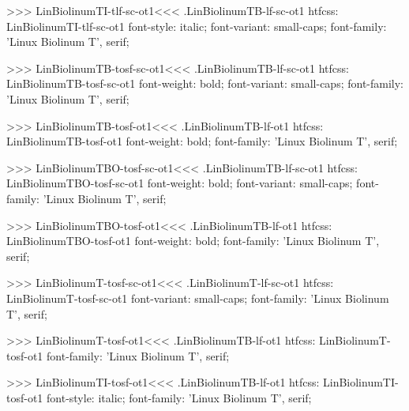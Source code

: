 {{{>>>
\<LinBiolinumTI-tlf-sc-ot1\><<<
.LinBiolinumTB-lf-sc-ot1
htfcss:  LinBiolinumTI-tlf-sc-ot1  font-style: italic; font-variant: small-caps; font-family: 'Linux Biolinum T', serif;

>>>
\<LinBiolinumTB-tosf-sc-ot1\><<<
.LinBiolinumTB-lf-sc-ot1
htfcss:  LinBiolinumTB-tosf-sc-ot1  font-weight: bold; font-variant: small-caps; font-family: 'Linux Biolinum T', serif;

>>>
\<LinBiolinumTB-tosf-ot1\><<<
.LinBiolinumTB-lf-ot1
htfcss:  LinBiolinumTB-tosf-ot1  font-weight: bold; font-family: 'Linux Biolinum T', serif;

>>>
\<LinBiolinumTBO-tosf-sc-ot1\><<<
.LinBiolinumTB-lf-sc-ot1
htfcss:  LinBiolinumTBO-tosf-sc-ot1  font-weight: bold; font-variant: small-caps; font-family: 'Linux Biolinum T', serif;

>>>
\<LinBiolinumTBO-tosf-ot1\><<<
.LinBiolinumTB-lf-ot1
htfcss:  LinBiolinumTBO-tosf-ot1  font-weight: bold; font-family: 'Linux Biolinum T', serif;

>>>
\<LinBiolinumT-tosf-sc-ot1\><<<
.LinBiolinumT-lf-sc-ot1
htfcss:  LinBiolinumT-tosf-sc-ot1  font-variant: small-caps; font-family: 'Linux Biolinum T', serif;

>>>
\<LinBiolinumT-tosf-ot1\><<<
.LinBiolinumTB-lf-ot1
htfcss:  LinBiolinumT-tosf-ot1  font-family: 'Linux Biolinum T', serif;

>>>
\<LinBiolinumTI-tosf-ot1\><<<
.LinBiolinumTB-lf-ot1
htfcss:  LinBiolinumTI-tosf-ot1  font-style: italic; font-family: 'Linux Biolinum T', serif;

}}}
